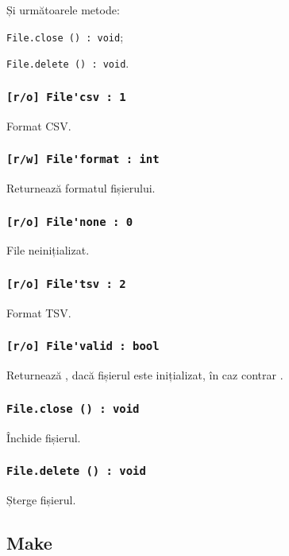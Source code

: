 Și următoarele metode:
\begin{icItems}
	\item \lstinline|File.close () : void|;
	\item \lstinline|File.delete () : void|.
\end{icItems}

\subsubsection{\lstinline|[r/o] File'csv : 1|}

Format CSV.

\subsubsection{\lstinline|[r/w] File'format : int|}

Returnează formatul fișierului.

\subsubsection{\lstinline|[r/o] File'none : 0|}

File neinițializat.

\subsubsection{\lstinline|[r/o] File'tsv : 2|}

Format TSV.

\subsubsection{\lstinline|[r/o] File'valid : bool|}

Returnează \true, dacă fișierul este inițializat, în caz contrar \false.

\subsubsection{\lstinline|File.close () : void|}

Închide fișierul.

\subsubsection{\lstinline|File.delete () : void|}

Șterge fișierul.

\subsection{{\color{orange} Make}}

